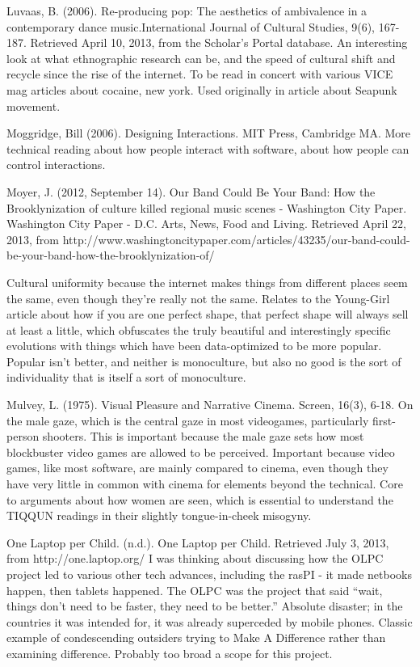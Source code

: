 Luvaas, B. (2006). Re-producing pop: The aesthetics of ambivalence in a contemporary dance music.International Journal of Cultural Studies, 9(6), 167-187. Retrieved April 10, 2013, from the 
	Scholar's Portal database.
	An interesting look at what ethnographic research can be, and the speed of cultural shift and recycle since the rise of the internet. To be read in concert with various VICE mag articles about cocaine, new york. Used originally in article about Seapunk movement.

Moggridge, Bill (2006). Designing Interactions. MIT Press, Cambridge MA.
	More technical reading about how people interact with software, about how people can control interactions.

Moyer, J. (2012, September 14). Our Band Could Be Your Band: How the Brooklynization of culture killed 
	regional music scenes - Washington City Paper. Washington City Paper - D.C. Arts, News, Food and 	
	Living. Retrieved April 22, 2013, from 
	http://www.washingtoncitypaper.com/articles/43235/our-band-could-be-your-band-how-the-brooklynization-of/

	Cultural uniformity because the internet makes things from different places seem the same, even though they’re really not the same. Relates to the Young-Girl article about how if you are one perfect shape, that perfect shape will always sell at least a little, which obfuscates the truly beautiful and interestingly specific evolutions with things which have been data-optimized to be more popular. Popular isn’t better, and neither is monoculture, but also no good is the sort of individuality that is itself a sort of monoculture.

Mulvey, L. (1975). Visual Pleasure and Narrative Cinema. Screen, 16(3), 6-18.
	On the male gaze, which is the central gaze in most videogames, particularly first-person shooters.	This is important because the male gaze sets how most blockbuster video games are allowed to be perceived. Important because video games, like most software, are mainly compared to cinema, even though they have very little in common with cinema for elements beyond the technical. Core to arguments about how women are seen, which is essential to understand the TIQQUN readings in their slightly tongue-in-cheek misogyny.

One Laptop per Child. (n.d.). One Laptop per Child. Retrieved July 3, 2013, from http://one.laptop.org/
	I was thinking about discussing how the OLPC project led to various other tech advances, including the rasPI - it made netbooks happen, then tablets happened. The OLPC was the project that said “wait, things don’t need to be faster, they need to be better.” Absolute disaster; in the countries it was intended for, it was already superceded by mobile phones. Classic example of condescending outsiders trying to Make A Difference rather than examining difference. Probably too broad a scope for this project.


